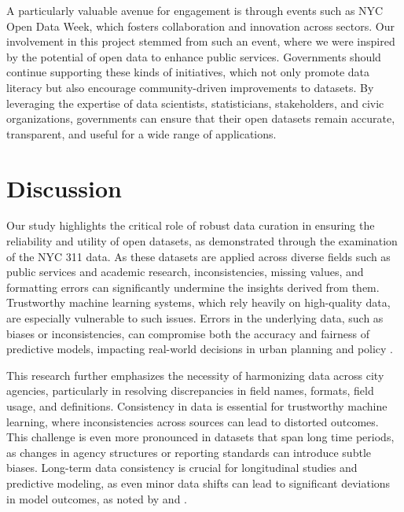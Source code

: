 \documentclass[linenumber]{jdsart}
\begin{document}
A particularly valuable avenue for engagement is through events such as NYC 
Open Data Week, which fosters collaboration and innovation across sectors. 
Our involvement in this project stemmed from such an event, where we were 
inspired by the potential of open data to enhance public services. Governments 
should continue supporting these kinds of initiatives, which not only promote 
data literacy but also encourage community-driven improvements to datasets. 
By leveraging the expertise of data scientists, statisticians, stakeholders, 
and civic organizations, governments can ensure that their open datasets 
remain accurate, transparent, and useful for a wide range of applications.


\section{Discussion} \label{sec:discussion}

Our study highlights the critical role of robust data curation in
ensuring the reliability and utility of open datasets, as demonstrated
through the examination of the NYC 311 data. As these datasets are
applied across diverse fields such as public services and academic
research, inconsistencies, missing values, and formatting errors can
significantly undermine the insights derived from them. Trustworthy
machine learning systems, which rely heavily on high-quality data, are
especially vulnerable to such issues. Errors in the underlying data,
such as biases or inconsistencies, can compromise both the accuracy
and fairness of predictive models, impacting real-world decisions in
urban planning and policy \citep{rahm2000data, geiger2020garbage}.


This research further emphasizes the necessity of harmonizing data
across city agencies, particularly in resolving discrepancies in field
names, formats, field usage, and definitions. Consistency in data is essential for
trustworthy machine learning, where inconsistencies across sources can
lead to distorted outcomes. This challenge is even more pronounced in
datasets that span long time periods, as changes in agency structures
or reporting standards can introduce subtle biases. Long-term data
consistency is crucial for longitudinal studies and predictive
modeling, as even minor data shifts can lead to significant deviations
in model outcomes, as noted by \citet{rahm2000data} and
\citet{borgman2012conundrum}.
\end{document}
